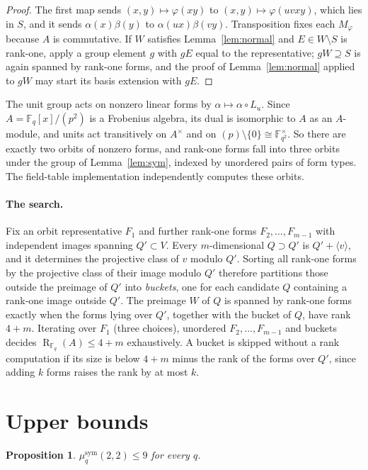 \documentclass[11pt]{amsart}
\newtheorem{proposition}[theorem]{Proposition}
\theoremstyle{definition}
\theoremstyle{remark}
\newcommand{\F}{\mathbb F}
\newcommand{\R}{\operatorname{R}}
\begin{document}
\begin{proof}
The first map sends $(x,y)\mapsto\varphi(xy)$ to $(x,y)\mapsto\varphi(uvxy)$, which lies in $S$, and it sends $\alpha(x)\beta(y)$ to $\alpha(ux)\beta(vy)$. Transposition fixes each $M_\varphi$ because $A$ is commutative. If $W$ satisfies Lemma~\ref{lem:normal} and $E\in W\setminus S$ is rank-one, apply a group element $g$ with $gE$ equal to the representative; $gW\supseteq S$ is again spanned by rank-one forms, and the proof of Lemma~\ref{lem:normal} applied to $gW$ may start its basis extension with $gE$.
\end{proof}

The unit group acts on nonzero linear forms by $\alpha\mapsto\alpha\circ L_u$. Since $A=\F_q[x]/(p^2)$ is a Frobenius algebra, its dual is isomorphic to $A$ as an $A$-module, and units act transitively on $A^\times$ and on $(p)\setminus\{0\}\cong\F_{q^2}^\times$. So there are exactly two orbits of nonzero forms, and rank-one forms fall into three orbits under the group of Lemma~\ref{lem:sym}, indexed by unordered pairs of form types. The field-table implementation independently computes these orbits.

\paragraph{The search.} Fix an orbit representative $F_1$ and further rank-one forms $F_2,\dots,F_{m-1}$ with independent images spanning $Q'\subset V$. Every $m$-dimensional $Q\supset Q'$ is $Q'+\langle v\rangle$, and it determines the projective class of $v$ modulo $Q'$. Sorting all rank-one forms by the projective class of their image modulo $Q'$ therefore partitions those outside the preimage of $Q'$ into \emph{buckets}, one for each candidate $Q$ containing a rank-one image outside $Q'$. The preimage $W$ of $Q$ is spanned by rank-one forms exactly when the forms lying over $Q'$, together with the bucket of $Q$, have rank $4+m$. Iterating over $F_1$ (three choices), unordered $F_2,\dots,F_{m-1}$ and buckets decides $\R_{\F_q}(A)\le4+m$ exhaustively. A bucket is skipped without a rank computation if its size is below $4+m$ minus the rank of the forms over $Q'$, since adding $k$ forms raises the rank by at most $k$.

\section{Upper bounds}\label{sec:upper}

\begin{proposition}\label{prop:nine}
$\mu_q^{\mathrm{sym}}(2,2)\le9$ for every $q$.
\end{proposition}
\end{document}
